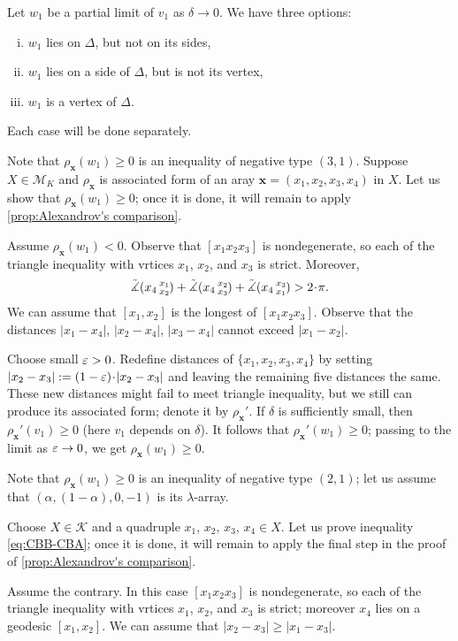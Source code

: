 \documentclass[a4paper,10pt]{article}
\begin{document}
Let $w_1$ be a partial limit of $v_1$ as $\delta\to 0$.
We have three options:
\begin{enumerate}[(i)]
\item\label{in} $w_1$ lies on $\Delta$, but not on its sides,
\item\label{side}$w_1$ lies on a side of $\Delta$, but is not its vertex,
\item\label{vertex} $w_1$ is a vertex of $\Delta$.
\end{enumerate}
Each case will be done separately.

Note that $\rho_{\bm{x}}(w_1)\ge0$ is an inequality of negative type $(3,1)$.
Suppose $X\in \mathcal{M}_K$ and $\rho_{\bm{x}}$ is associated form of an aray $\bm{x}=(x_1, x_2, x_3, x_4)$ in $X$.
Let us show that $\rho_{\bm{x}}(w_1)\ge0$;
once it is done, it will remain to apply \ref{prop:Alexandrov's comparison}.

Assume $\rho_{\bm{x}}(w_1)<0$.
Observe that $[x_1x_2x_3]$ is nondegenerate, so each of the triangle inequality with vrtices $x_1$, $x_2$, and $x_3$ is strict.
Moreover,
\[\angk{x_4}{x_1}{x_2}+\angk{x_4}{x_2}{x_3}+\angk{x_4}{x_3}{x_1}>2\cdot\pi.\]
We can assume that $[x_1,x_2]$ is the longest of $[x_1x_2x_3]$.
Observe that the distances $|x_1-x_4|$, $|x_2-x_4|$, $|x_3-x_4|$ cannot exceed $|x_1-x_2|$.

Choose small $\varepsilon>0$.
Redefine distances of $\{x_1,x_2,x_3,x_4\}$ by setting $|x_2-x_3|\z{\mathrel{:=}}(1-\eps)\cdot|x_2-x_3|$ and leaving the remaining five distances the same.
These new distances might fail to meet triangle inequality, but we still can produce its associated form;
denote it by $\rho_{\bm{x}}'$.
If $\delta$ is sufficiently small, then $\rho_{\bm{x}}'(v_1)\ge0$ (here $v_1$ depends on $\delta$).
It follows that $\rho_{\bm{x}}'(w_1)\ge0$;
passing to the limit as $\varepsilon\to 0$, we get $\rho_{\bm{x}}(w_1)\ge0$.

Note that $\rho_{\bm{x}}(w_1)\ge0$ is an inequality of negative type $(2,1)$;
let us assume that $(\alpha,(1-\alpha), 0,-1)$ is its $\lambda$-array.

Choose $X\in \mathcal{K}$ and a quadruple $x_1$, $x_2$, $x_3$, $x_4\in X$.
Let us prove inequality \ref{eq:CBB-CBA};
once it is done, it will remain to apply the final step in the proof of \ref{prop:Alexandrov's comparison}.

Assume the contrary.
In this case $[x_1x_2x_3]$ is nondegenerate, so each of the triangle inequality with vrtices $x_1$, $x_2$, and $x_3$ is strict; moreover $x_4$ lies on a geodesic $[x_1,x_2]$.
We can assume that $|x_2-x_3|\ge |x_1-x_3|$.
\end{document}
